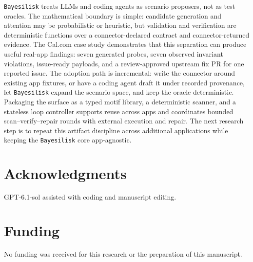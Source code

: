 \documentclass[10pt]{article}
\newcommand{\tool}{\texttt{Bayesilisk}\xspace}
\begin{document}
\tool treats LLMs and coding agents as scenario proposers, not as test oracles.
The mathematical boundary is simple: candidate generation and attention may be
probabilistic or heuristic, but validation and verification are deterministic
functions over a connector-declared contract and connector-returned evidence.
The Cal.com case study demonstrates that this separation can produce useful
real-app findings: seven generated probes, seven observed invariant violations,
issue-ready payloads, and a review-approved upstream fix PR for one reported
issue. The
adoption path is incremental: write the connector around existing app fixtures,
or have a coding agent draft it under recorded provenance, let \tool expand the
scenario space, and keep the oracle deterministic. Packaging the surface as a
typed motif library, a deterministic scanner, and a stateless loop controller
supports reuse across apps and coordinates bounded scan--verify--repair rounds
with external execution and repair. The next
research step is to repeat this artifact discipline across additional
applications while keeping the \tool core app-agnostic.

\section*{Acknowledgments}

GPT-6.1-sol assisted with coding and manuscript editing.

\section*{Funding}

No funding was received for this research or the preparation of this manuscript.



\end{document}
